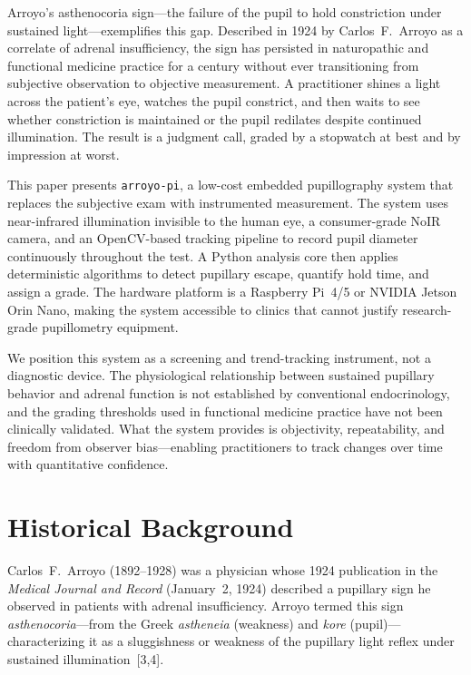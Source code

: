 \documentclass[11pt]{article}
\begin{document}
Arroyo's asthenocoria sign---the failure of the pupil to hold constriction
under sustained light---exemplifies this gap. Described in 1924 by Carlos~F.\
Arroyo as a correlate of adrenal insufficiency, the sign has persisted in
naturopathic and functional medicine practice for a century without ever
transitioning from subjective observation to objective measurement. A
practitioner shines a light across the patient's eye, watches the pupil
constrict, and then waits to see whether constriction is maintained or the
pupil redilates despite continued illumination. The result is a judgment call,
graded by a stopwatch at best and by impression at worst.

This paper presents \texttt{arroyo-pi}, a low-cost embedded pupillography
system that replaces the subjective exam with instrumented measurement. The
system uses near-infrared illumination invisible to the human eye, a
consumer-grade NoIR camera, and an OpenCV-based tracking pipeline to record
pupil diameter continuously throughout the test. A Python analysis core then
applies deterministic algorithms to detect pupillary escape, quantify hold
time, and assign a grade. The hardware platform is a Raspberry Pi~4/5 or
NVIDIA Jetson Orin Nano, making the system accessible to clinics that cannot
justify research-grade pupillometry equipment.

We position this system as a screening and trend-tracking instrument, not a
diagnostic device. The physiological relationship between sustained pupillary
behavior and adrenal function is not established by conventional
endocrinology, and the grading thresholds used in functional medicine
practice have not been clinically validated. What the system provides is
objectivity, repeatability, and freedom from observer bias---enabling
practitioners to track changes over time with quantitative confidence.

\section{Historical Background}

Carlos~F.\ Arroyo (1892--1928) was a physician whose 1924 publication in the
\textit{Medical Journal and Record} (January~2, 1924) described a pupillary
sign he observed in patients with adrenal insufficiency. Arroyo termed this
sign \textit{asthenocoria}---from the Greek \textit{astheneia} (weakness) and
\textit{kore} (pupil)---characterizing it as a sluggishness or weakness of the
pupillary light reflex under sustained illumination~[3,4].
\end{document}
